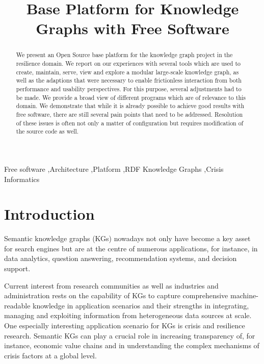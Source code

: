 \documentclass[
hf
]{ceurart}
\begin{document}
\title{Base Platform for Knowledge Graphs with Free Software}



\begin{abstract}
We present an Open Source base platform for the \CoyPu knowledge graph project in the resilience domain. We report on our experiences with several tools which are used to create, maintain, serve, view and explore a modular large-scale knowledge graph, as well as 
the adaptions that were necessary to enable frictionless interaction from both performance and usability perspectives.
For this purpose, several adjustments had to be made. We provide a broad view of different programs which are of relevance to this domain. We demonstrate that while it is already possible to achieve good results with free software, there are still several pain points that need to be addressed. Resolution of these issues is often not only a matter of configuration but requires modification of the source code as well.
\end{abstract}

\begin{keywords}
Free software \sep Architecture \sep Platform \sep RDF Knowledge Graphs \sep Crisis Informatics
\end{keywords}

\maketitle

\setlength{\aweboxleftmargin}{0.06\linewidth}\setlength{\aweboxcontentwidth}{0.9\linewidth}

\section{Introduction} %

Semantic knowledge graphs (KGs) nowadays not only have become a key asset for search engines but are at the centre of numerous applications, for instance, in data analytics, question answering, recommendation systems, and decision support. 

Current interest from research communities as well as industries and administration rests on the capability of KGs to capture comprehensive machine-readable knowledge in application scenarios and their strengths in integrating, managing and exploiting information from heterogeneous data sources at scale. One especially interesting application scenario for KGs is crisis and resilience research. Semantic KGs can play a crucial role in increasing transparency of, for instance, economic value chains and in understanding the complex mechanisms of crisis factors at a global level. 
\end{document}
